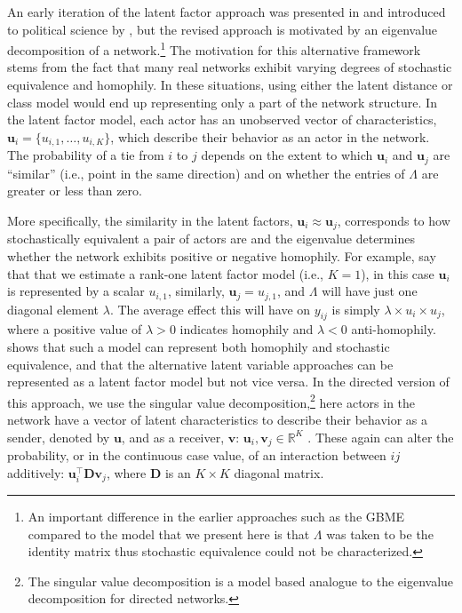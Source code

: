 \documentclass[11pt,pdflatex]{elsarticle}
\begin{document}
An early iteration of the latent factor approach was presented in \citet{hoff:2005} and introduced to political science by \citet{hoff:ward:2004}, but the revised approach is motivated by an eigenvalue decomposition of a network.\footnote{An important difference in the earlier approaches such as the GBME compared to the model that we present here is that $\Lambda$ was taken to be the identity matrix thus stochastic equivalence could not be characterized.} The motivation for this alternative framework stems from the fact that many real networks exhibit varying degrees of stochastic equivalence and homophily. In these situations, using either the latent distance or class model would end up representing only a part of the network structure. In the latent factor model, each actor has an unobserved vector of characteristics, $\textbf{u}_{i} = \{u_{i,1}, \ldots, u_{i,K} \}$, which describe their behavior as an actor in the network. The probability of a tie from $i$ to $j$ depends on the extent to which $\textbf{u}_{i}$ and $\textbf{u}_{j}$ are ``similar'' (i.e., point in the same direction) and on whether the entries of $\Lambda$ are greater or less than zero. 

More specifically, the similarity in the latent factors, $\textbf{u}_{i} \approx \textbf{u}_{j}$, corresponds to how stochastically equivalent a pair of actors are and the eigenvalue determines whether the network exhibits positive or negative homophily. For example, say that that we estimate a rank-one latent factor model (i.e., $K=1$), in this case $\textbf{u}_{i}$ is represented by a scalar $u_{i,1}$, similarly, $\textbf{u}_{j}=u_{j,1}$, and $\Lambda$ will have just one diagonal element $\lambda$. The average effect this will have on $y_{ij}$ is simply $\lambda \times u_{i} \times u_{j}$, where a positive value of $\lambda>0$ indicates homophily and $\lambda<0$ anti-homophily. \citet{hoff:2008} shows that such a model can represent both homophily and stochastic equivalence, and that the alternative latent variable approaches can be represented as a latent factor model but not vice versa. In the directed version of this approach, we use the singular value decomposition,\footnote{The singular value decomposition is a model based analogue to the eigenvalue decomposition for directed networks.} here actors in the network have a vector of latent characteristics to describe their behavior as a sender, denoted by $\textbf{u}$, and as a receiver, $\textbf{v}$: $\textbf{u}_{i}, \textbf{v}_{j} \in \mathbb{R}^{K}$ \citep{hoff:2009}. These again can alter the probability, or in the continuous case value, of an interaction between $ij$ additively: $\textbf{u}_{i}^{\top} \textbf{D} \textbf{v}_{j}$, where $\textbf{D}$ is an $K \times K$ diagonal matrix. 
\end{document}
